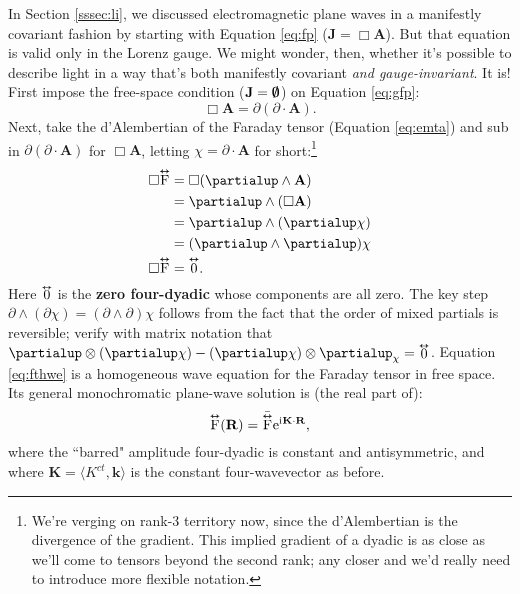 \documentclass[12pt]{article}
\renewcommand{\vv}[1]{\mathbf{#1}}
\newcommand{\tightoverset}[2]{%
  \mathop{#2}\limits^{\vbox to -.5ex{\kern-0.75ex\hbox{$#1$}\vss}}}
\newcommand{\inlinedy}[1]{\tightoverset{\text{\tiny$\bm\leftrightarrow$}}{#1}}
\newcommand{\capdy}[1]{ \overset{ \text{\tiny$\bm\leftrightarrow$} }{\vphantom{\text{\small{A}}}\smash{#1}} }
\begin{document}
In Section \ref{sssec:li}, we discussed electromagnetic plane waves in a manifestly covariant fashion by starting with Equation \ref{eq:fp} ($\vv J = \Box \vv A$). But that equation is valid only in the Lorenz gauge. We might wonder, then, whether it's possible to describe light in a way that's both manifestly covariant \emph{and gauge-invariant}. It is! First impose the free-space condition ($\vv J = \textrm{\mbox{\boldmath $\emptyset$}}$) on Equation \ref{eq:gfp}:
\begin{equation*}
\Box \vv A = \partialup(\partialup \cdot \vv A).
\end{equation*}
Next, take the d'Alembertian of the Faraday tensor (Equation \ref{eq:emta}) and sub in $\partialup(\partialup \cdot \vv A)$ for $\Box \vv A$, letting $\chi = \partialup \cdot \vv A$ for short:\footnote{We're verging on rank-3 territory now, since the d'Alembertian is the divergence of the gradient. This implied gradient of a dyadic is as close as we'll come to tensors beyond the second rank; any closer and we'd really need to introduce more flexible notation.}
\begin{equation}\label{eq:fthwe}
\begin{split}
\Box \capdy{\mathrm{F}} &= \Box ( \partialup \wedge \vv A ) \\
&= \partialup \wedge ( \Box \vv A) \\
&= \partialup \wedge (\partialup \chi) \\
&= ( \partialup \wedge \partialup ) \chi \\
\Box \capdy{\mathrm{F}} &= \capdy{0} .
\end{split}
\end{equation}
Here $\inlinedy{0}$ is the \textbf{zero four-dyadic} whose components are all zero. The key step $\partialup \wedge (\partialup \chi) = (\partialup \wedge \partialup) \chi$ follows from the fact that the order of mixed partials is reversible; verify with matrix notation that $\partialup \otimes ( \partialup \chi ) - ( \partialup \chi ) \otimes \partialup_{\chi} = \inlinedy{0}$. Equation \ref{eq:fthwe} is a homogeneous wave equation for the Faraday tensor in free space. Its general monochromatic plane-wave solution is (the real part of):
\begin{equation}\label{eq:ftwe}
\capdy{\mathrm{F}} (\vv R) = \bar{\capdy{\mathrm{F}}} \mathrm{e}^{\mathrm{i} \mkern.5mu \vv K \cdot \vv R} ,
\end{equation}
where the ``barred" amplitude four-dyadic is constant and antisymmetric, and where $\vv K = \langle K^{ct}, \vv k \rangle$ is the constant four-wavevector as before.
\end{document}
